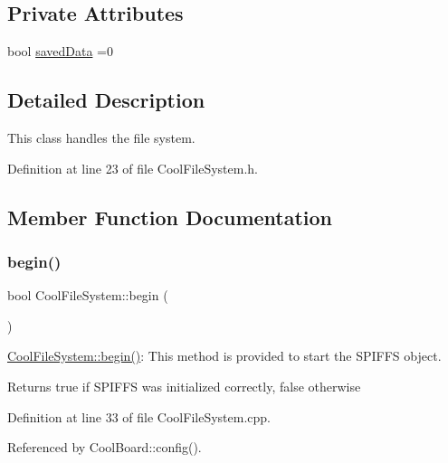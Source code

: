\subsection*{Private Attributes}
\begin{DoxyCompactItemize}
\item 
bool \hyperlink{classCoolFileSystem_ad398e0c5c41a0c88acdf5d672aa71351}{saved\+Data} =0
\end{DoxyCompactItemize}


\subsection{Detailed Description}
This class handles the file system. 

Definition at line 23 of file Cool\+File\+System.\+h.



\subsection{Member Function Documentation}
\mbox{\label{classCoolFileSystem_a6ba6f666ed4c530174f8569d2c636748}} 
\subsubsection{\texorpdfstring{begin()}{begin()}}
{\footnotesize\ttfamily bool Cool\+File\+System\+::begin (\begin{DoxyParamCaption}{ }\end{DoxyParamCaption})}

\hyperlink{classCoolFileSystem_a6ba6f666ed4c530174f8569d2c636748}{Cool\+File\+System\+::begin()}\+: This method is provided to start the S\+P\+I\+F\+FS object.

\begin{DoxyReturn}{Returns}
true if S\+P\+I\+F\+FS was initialized correctly, false otherwise 
\end{DoxyReturn}


Definition at line 33 of file Cool\+File\+System.\+cpp.



Referenced by Cool\+Board\+::config().


